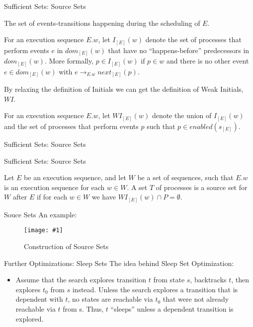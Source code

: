 \documentclass[9pt]{beamer}
\newcommand{\trace}[2]{
\begin{figure}[H]
\centering
\texttt{[image: \#1]}
\caption{#2}
\label{#2}
\end{figure}
}
\begin{document}
\begin{frame}{Sufficient Sets: Source Sets}
\begin{definition}[$dom(E)$]
    The set of events-transitions happening during the scheduling of $E$.
\end{definition}

\begin{definition}
For an execution sequence $E.w$, let $I_{[E]}(w)$ denote the set of
processes that perform events $e$ in $dom_{[E]}(w)$ that have no
“happens-before” predecessors in $dom_{[E]}(w)$. More formally,
$p \in I_{[E]}(w)$ if $p \in w$ and there is no other event $e \in dom_{[E]}(w)$ with
$e \rightarrow_{E.w} next_{[E]}(p)$.
\end{definition}

By relaxing the definition of Initials we can get the definition of Weak Initials, $WI$.

\begin{definition}
For an execution sequence $E.w$, let $WI_{[E]}(w)$ denote the union of $I_{[E]}(w)$ and the set of
processes that perform events $p$ such that $p \in enabled(s_{[E]}) $.
\end{definition}
    
\end{frame}

\begin{frame}{Sufficient Sets: Source Sets}
    
    
\end{frame}

\begin{frame}{Sufficient Sets: Source Sets}

\begin{definition}
Let $E$ be an execution sequence,
and let $W$ be a set of sequences, such that $E.w$ is an execution
sequence for each $w \in W$. A set $T$ of processes is a source set for
$W$ after $E$ if for each $w \in W$ we have $WI_{[E]}(w) \cap P  = \emptyset$.
\end{definition}

\end{frame}

\begin{frame}{Souce Sets}
An example:
\trace{../img/source.pdf}{Construction of Source Sets}
\end{frame}

\begin{frame}{Further Optimizations: Sleep Sets}
The idea behind Sleep Set Optimization:

\begin{itemize}
\item Assume that the search explores transition $t$ from state $s$, backtracks $t$, then explores $t_0$ from $s$ instead.
Unless the search explores a transition that is dependent with $t$, no states are reachable via $t_0$ that were not
already reachable via $t$ from s. Thus, $t$ ``sleeps'' unless a dependent transition is explored.
    
\end{itemize}
\end{frame}
\end{document}
